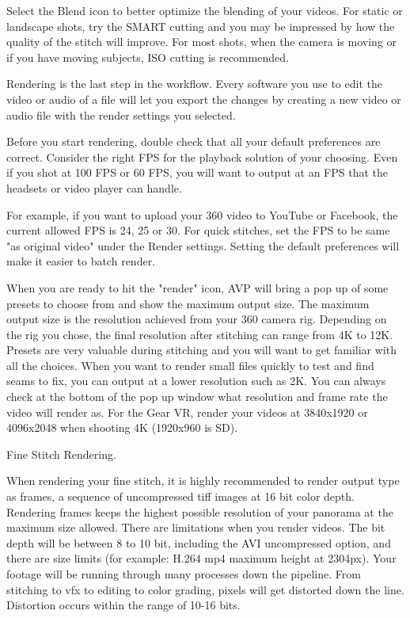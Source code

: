 \begin{fullwidth}
Select the Blend icon to better optimize the blending of your videos. For static or landscape shots, try the SMART cutting and you may be impressed by how the quality of the stitch will improve. For most shots, when the camera is moving or if you have moving subjects, ISO cutting is recommended.

Rendering is the last step in the workflow. Every software you use to edit the video or audio of a file will let you export the changes by creating a new video or audio file with the render settings you selected.

Before you start rendering, double check that all your default preferences are correct. Consider the right FPS for the playback solution of your choosing. Even if you shot at 100 FPS or 60 FPS, you will want to output at an FPS that the headsets or video player can handle. 

For example, if you want to upload your 360 video to YouTube or Facebook, the current allowed FPS is 24, 25 or 30. For quick stitches, set the FPS to be same "as original video" under the Render settings. Setting the default preferences will make it easier to batch render.


When you are ready to hit the "render" icon, AVP will bring a pop up of some presets to choose from and show the maximum output size. The maximum output size is the resolution achieved from your 360 camera rig. Depending on the rig you chose, the final resolution after stitching can range from 4K to 12K. Presets are very valuable during stitching and you will want to get familiar with all the choices. When you want to render small files quickly to test and find seams to fix, you can output at a lower resolution such as 2K. You can always check at the bottom of the pop up window what resolution and frame rate the video will render as. For the Gear VR, render your videos at 3840x1920 or 4096x2048 when shooting 4K (1920x960 is SD).

{\large Fine Stitch Rendering. \par}

When rendering your fine stitch, it is highly recommended to render output type as frames, a sequence of uncompressed tiff images at 16 bit color depth. Rendering frames keeps the highest possible resolution of your panorama at the maximum size allowed. There are limitations when you render videos. The bit depth will be between 8 to 10 bit, including the AVI uncompressed option, and there are size limits (for example: H.264 mp4 maximum height at 2304px). Your footage will be running through many processes down the pipeline. From stitching to vfx to editing to color grading, pixels will get distorted down the line. Distortion occurs within the range of 10-16 bits. 


\end{fullwidth}
